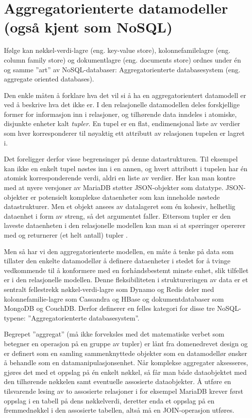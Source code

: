 \section{Aggregatorienterte datamodeller (også kjent som NoSQL)}

Ifølge \cite{sadalage2013} kan nøkkel-verdi-lagre (eng. key-value store), kolonnefamilelagre (eng. column family store) og dokumentlagre (eng. documents store) ordnes under én og samme ''art'' av NoSQL-databaser: Aggregatorienterte databasesystem (eng. aggregate oriented databases).

Den enkle måten å forklare hva det vil si å ha en aggregatorientert datamodell er ved å beskrive hva det ikke er. I den relasjonelle datamodellen deles forskjellige former for informasjon inn i relasjoner, og tilhørende data inndeles i atomiske, disjunkte enheter kalt \emph{tupler}. En tupel er en flat, endimensjonal liste av verdier som hver korresponderer til nøyaktig ett attributt av relasjonen tupelen er lagret i.

Det foreligger derfor visse begrensinger på denne datastrukturen. Til eksempel kan ikke en enkelt tupel nøstes inn i en annen, og hvert attributt i tupelen har én atomisk korresponderende verdi, aldri en liste av verdier. Her kan man kontre med at nyere versjoner av MariaDB støtter JSON-objekter som datatype. JSON-objekter er potensielt komplekse dataenheter som kan inneholde nøstede datastrukturer. Men et objekt ansees av datalageret som én kohesiv, helhetlig dataenhet i form av streng, så det argumentet faller. Ettersom tupler er den laveste dataenheten i den relasjonelle modellen kan man si at spørringer opererer med og returnerer (et helt antall) tupler \citep{sadalage2013}.

Men så har vi den aggregatorienterte modellen, en måte å tenke på data som tillater den enkelte datamodellør å definere dataenheter i stedet for å tvinge vedkommende til å konformere med en forhåndsbestemt minste enhet, slik tilfellet er i den relasjonelle modellen. Denne fleksibiliteten i struktureringen av data er et sentralt fellestrekk nøkkel-verdi-lagre som Dynamo og Redis deler med kolonnefamilie-lagre som Cassandra og HBase og dokumentdatabaser som MongoDB og CouchDB. Derfor definerer \cite{sadalage2013} en felles kategori for disse tre NoSQL-typene: ''Aggregatorienterte databasesystem''.

Begrepet ''aggregat'' (må ikke forveksles med det matematiske verbet som betegner en operasjon på en gruppe av tupler) er lånt fra domenedrevet design og er definert som en samling sammenknyttede objekter som en datamodellør ønsker å behandle som en datamanipulasjonsenhet. Når komplekse aggregater aksesseres, gjøres det med et oppslag på én enkelt nøkkel, så får man både dataobjektet med den tilhørende nøkkelen samt eventuelle assosierte dataobjekter. Å utføre en tilsvarende lesing av to assosierte relasjoner i for eksempel MariaDB krever først oppslag i en tabell på dens nøkkelverdi, deretter enda et oppslag på en fremmednøkkel i den assosierte tabellen, altså må en JOIN-operasjon utføres. 

